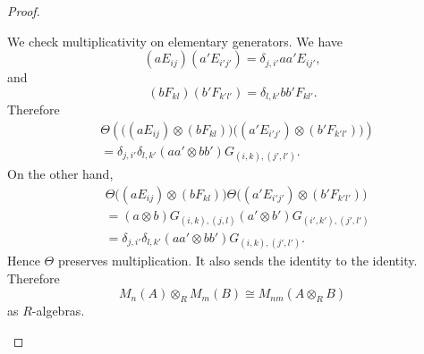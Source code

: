 \begin{proof}
\begin{enumerate}
              We check multiplicativity on elementary generators. We have
              \[
                  (aE_{ij})(a'E_{i'j'})
                  =
                  \delta_{j,i'}aa'E_{ij'},
              \]
              and
              \[
                  (bF_{kl})(b'F_{k'l'})
                  =
                  \delta_{l,k'}bb'F_{kl'}.
              \]
              Therefore
              \[
              \begin{aligned}
                  &\Theta\left(
                  \bigl((aE_{ij})\otimes (bF_{kl})\bigr)
                  \bigl((a'E_{i'j'})\otimes (b'F_{k'l'})\bigr)
                  \right) \\
                  &=
                  \delta_{j,i'}\delta_{l,k'}
                  (aa'\otimes bb')G_{(i,k),(j',l')}.
              \end{aligned}
              \]
              On the other hand,
              \[
              \begin{aligned}
                  &\Theta\bigl((aE_{ij})\otimes (bF_{kl})\bigr)
                  \Theta\bigl((a'E_{i'j'})\otimes (b'F_{k'l'})\bigr) \\
                  &=
                  (a\otimes b)G_{(i,k),(j,l)}
                  (a'\otimes b')G_{(i',k'),(j',l')} \\
                  &=
                  \delta_{j,i'}\delta_{l,k'}
                  (aa'\otimes bb')G_{(i,k),(j',l')}.
              \end{aligned}
              \]
              Hence \(\Theta\) preserves multiplication. It also sends the identity to
              the identity. Therefore
              \[
                  M_n(A)\otimes_R M_m(B)
                  \cong
                  M_{nm}(A\otimes_R B)
              \]
              as \(R\)-algebras.
    \end{enumerate}
    \end{proof}